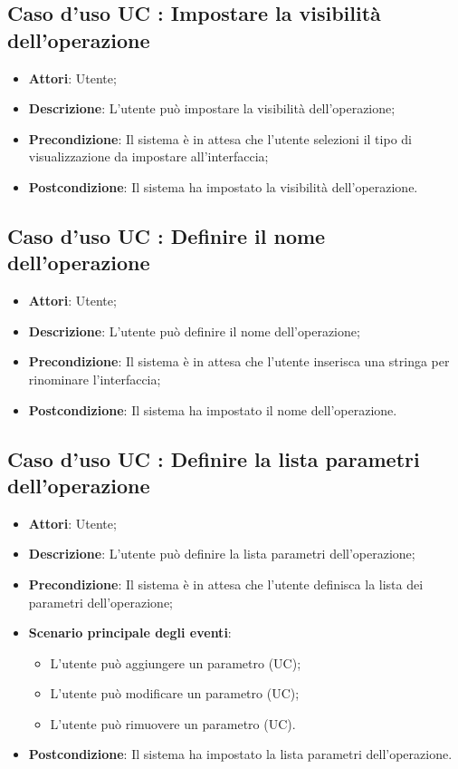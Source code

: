 \documentclass[../AnalisiDeiRequisiti.tex]{subfiles}
\begin{document}
		\subsection{Caso d'uso UC : Impostare la visibilità dell'operazione}
			\begin{itemize}
				\item \textbf{Attori}: Utente;
				\item \textbf{Descrizione}: L'utente può impostare la visibilità
				dell'operazione;
				\item \textbf{Precondizione}: Il sistema è in attesa che l'utente selezioni il
				tipo di visualizzazione da impostare all'interfaccia;
				\item \textbf{Postcondizione}: Il sistema ha impostato la visibilità
				dell'operazione.
			\end{itemize}
		\subsection{Caso d'uso UC : Definire il nome dell'operazione}
			\begin{itemize}
				\item \textbf{Attori}: Utente;
				\item \textbf{Descrizione}: L'utente può definire il nome dell'operazione;
				\item \textbf{Precondizione}: Il sistema è in attesa che l'utente inserisca
				una stringa per rinominare l'interfaccia;
				\item \textbf{Postcondizione}: Il sistema ha impostato il nome
				dell'operazione.
			\end{itemize}
		\subsection{Caso d'uso UC : Definire la lista parametri dell'operazione}
			\begin{itemize}
				\item \textbf{Attori}: Utente;
				\item \textbf{Descrizione}: L'utente può definire la lista parametri
				dell'operazione;
				\item \textbf{Precondizione}: Il sistema è in attesa che l'utente definisca
				la lista dei parametri dell'operazione;
				\item \textbf{Scenario principale degli eventi}:
					\begin{itemize}
						\item L'utente può aggiungere un parametro (UC);
						\item L'utente può modificare un parametro (UC);
						\item L'utente può rimuovere un parametro (UC).
					\end{itemize}
				\item \textbf{Postcondizione}: Il sistema ha impostato la lista parametri
				dell'operazione.
			\end{itemize}
\end{document}
